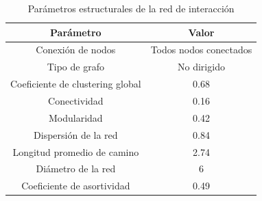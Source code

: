 \begin{table}[ht]
	\centering
	\begin{tabular}{|c|c|}
		\hline
		\textbf{Parámetro} & \textbf{Valor} \\ \hline
		Conexión de nodos & Todos nodos conectados \\ \hline
		Tipo de grafo & No dirigido \\ \hline
		Coeficiente de clustering global & 0.68 \\ \hline
		Conectividad & 0.16 \\ \hline
		Modularidad & 0.42 \\ \hline
		Dispersión de la red & 0.84 \\ \hline
		Longitud promedio de camino & 2.74 \\ \hline
		Diámetro de la red & 6 \\ \hline
		Coeficiente de asortividad & 0.49 \\ \hline
	\end{tabular}
	\caption{Parámetros estructurales de la red de interacción}
	\label{tab:parametros_red}
\end{table}

